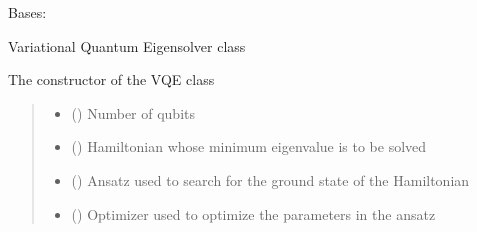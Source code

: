 \documentclass[letterpaper,10pt,english]{sphinxmanual}
\begin{document}
\begin{fulllineitems}
\label{\detokenize{qcompute_qapp.algorithm:qcompute_qapp.algorithm.VQE}}
\pysigstartsignatures
{}
\pysigstopsignatures
\sphinxAtStartPar
Bases: 

\sphinxAtStartPar
Variational Quantum Eigensolver class

\sphinxAtStartPar
The constructor of the VQE class
\begin{quote}\begin{description}
\begin{itemize}
\item {} 
\sphinxAtStartPar
{} () \textendash{} Number of qubits

\item {} 
\sphinxAtStartPar
{} () \textendash{} Hamiltonian whose minimum eigenvalue is to be solved

\item {} 
\sphinxAtStartPar
{} ({\hyperref[\detokenize{qcompute_qapp.circuit:qcompute_qapp.circuit.ParameterizedCircuit}]{}}) \textendash{} Ansatz used to search for the ground state of the Hamiltonian

\item {} 
\sphinxAtStartPar
{} ({\hyperref[\detokenize{qcompute_qapp.optimizer:qcompute_qapp.optimizer.BasicOptimizer}]{}}) \textendash{} Optimizer used to optimize the parameters in the ansatz


\end{itemize}
\end{description}
\end{quote}
\end{fulllineitems}
\end{document}
